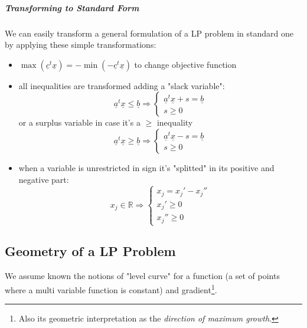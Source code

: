 \documentclass{article}
\begin{document}
				\subparagraph{Transforming to Standard Form}
					We can easily transform a general formulation of a LP problem in standard one by applying these simple transformations:
					\begin{itemize}
						\item $\max(\underline{c}^t\underline{x}) = -\min(-\underline{c}^t\underline{x})$ to change objective function
						\item all inequalities are transformed adding a "slack variable":
							\begin{equation}
								\underline{a}^t\underline{x} \leq \underline{b} \Rightarrow
									\begin{cases}
										\underline{a}^t\underline{x} + s = \underline{b}\\
										s \geq 0
									\end{cases}
							\end{equation}
							or a surplus variable in case it's a $\geq$ inequality
							\begin{equation}
								\underline{a}^t\underline{x} \geq \underline{b} \Rightarrow
									\begin{cases}
										\underline{a}^t\underline{x} - s = \underline{b}\\
										s \geq 0
									\end{cases}
							\end{equation}
						\item when a variable is unrestricted in sign it's "splitted" in its positive and negative part:
							\begin{equation}
								x_j \in \mathbb{R} \Rightarrow
									\begin{cases}
											x_j = x_j'-x_j''\\
											x_j' \geq 0\\
											x_j'' \geq 0
									\end{cases}
							\end{equation}
					\end{itemize}

		\subsection{Geometry of a LP Problem}
			We assume known the notions of "level curve" for a function (a set of points where a multi variable function is constant) and gradient\footnote{Also its geometric interpretation as the \textit{direction of maximum growth}.}.
\end{document}
